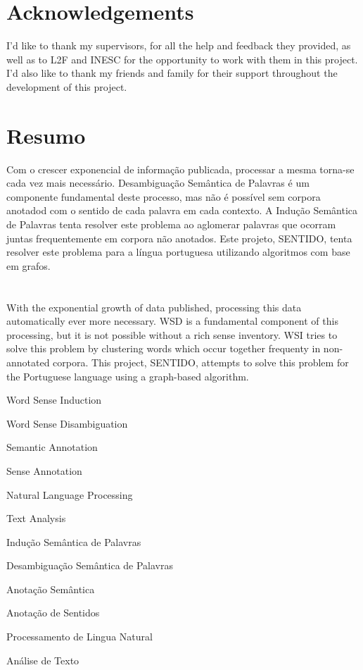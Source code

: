 \cleardoublepage
\chapter*{Acknowledgements}
I'd like to thank my supervisors, for all the help and feedback they provided, as well as to L2F and
INESC for the opportunity to work with them in this project. I'd also like to thank my friends and
family for their support throughout the development of this project.

\cleardoublepage
\chapter*{Resumo}
Com o crescer exponencial de informação publicada, processar a mesma torna-se
cada vez mais necessário. Desambiguação Semântica de Palavras é um componente
fundamental deste processo, mas não é possível sem corpora anotadod com o
sentido de cada palavra em cada contexto. A Indução Semântica de Palavras tenta
resolver este problema ao aglomerar palavras que ocorram juntas frequentemente
em corpora não anotados. Este projeto, \acf*{SENTIDO}, tenta resolver este
problema para a língua portuguesa utilizando algoritmos com base em grafos.

\cleardoublepage
\chapter*{\abstractname}
With the exponential growth of data published, processing this data
automatically ever more necessary. \acf*{WSD} is a fundamental component of this
processing, but it is not possible without a rich sense inventory. \acf*{WSI}
tries to solve this problem by clustering words which occur together frequenty
in non-annotated corpora. This project, \acf*{SENTIDO}, attempts to solve this
problem for the Portuguese language using a graph-based algorithm.

\cleardoublepage
{}
\begin{keywords}
Word Sense Induction

Word Sense Disambiguation

Semantic Annotation

Sense Annotation

Natural Language Processing

Text Analysis

\bigskip
\bigskip
Indução Semântica de Palavras

Desambiguação Semântica de Palavras

Anotação Semântica

Anotação de Sentidos

Processamento de Lingua Natural

Análise de Texto

\end{keywords}

